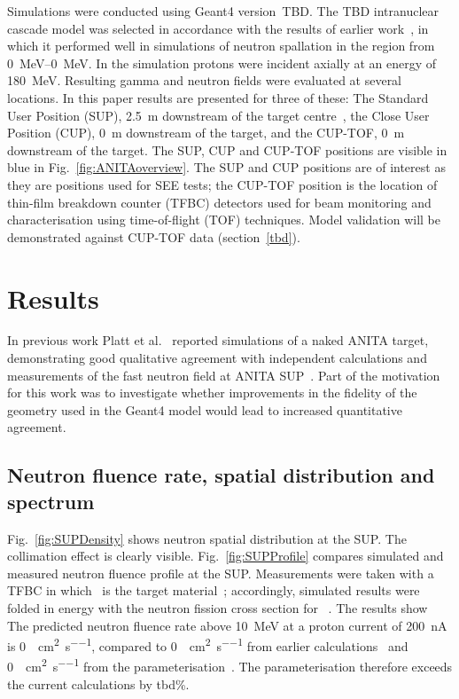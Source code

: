 \documentclass[12pt,journal]{IEEEtran}
\def\U238{\BPChem{\^{238}U}}
\begin{document}
Simulations were conducted using Geant4 version~TBD.
The TBD intranuclear cascade model was selected in accordance with the results of earlier work~\cite{Platt13}, in which it performed well in simulations of neutron spallation in the region from \SIrange{0}{0}{\MeV}.
In the simulation protons were incident axially at an energy of \SI{180}{\MeV}.
Resulting gamma and neutron fields were evaluated at several locations.
In this paper results are presented for three of these: The Standard User Position (SUP), \SI{2.5}{\m} downstream of the target centre~\cite{Prokofiev2009}, the Close User Position (CUP), \SI{0}{\m} downstream of the target, and the CUP-TOF, \SI{0}{m} downstream of the target.
The SUP, CUP and CUP-TOF positions are visible in blue in Fig.~\ref{fig:ANITAoverview}.
The SUP and CUP positions are of interest as they are positions used for SEE tests; the CUP-TOF position is the location of thin-film breakdown counter (TFBC) detectors used for beam monitoring and characterisation using time-of-flight (TOF) techniques.
Model validation will be demonstrated against CUP-TOF data (section~\ref{tbd}).

\section{Results}

In previous work Platt et al.~\cite{Platt13} reported simulations of a naked ANITA target, demonstrating good qualitative agreement with independent calculations and measurements of the fast neutron field at ANITA SUP~\cite{Prokofiev2009}.
Part of the motivation for this work was to investigate whether improvements in the fidelity of the geometry used in the Geant4 model would lead to increased quantitative agreement.

\subsection{Neutron fluence rate, spatial distribution and spectrum}

Fig.~\ref{fig:SUPDensity} shows neutron spatial distribution at the SUP.
The collimation effect is clearly visible.
Fig.~\ref{fig:SUPProfile} compares simulated and measured neutron fluence profile at the SUP.
Measurements were taken with a TFBC in which \U238\ is the target material~\cite{Prokofiev2009}; accordingly, simulated results were folded in energy with the neutron fission cross section for \U238~\cite{tbd}.
The results show~
The predicted neutron fluence rate above \SI{10}{\MeV} at a proton current of \SI{200}{\nA} is \SI{0}{\neutron\per\cm\squared\per\second}, compared to \SI{0}{\neutron\per\cm\squared\per\second} from earlier calculations~\cite{Platt13} and \SI{0}{\neutron\per\cm\squared\per\second} from the parameterisation~\cite{Prokofiev2009}.
The parameterisation therefore exceeds the current calculations by tbd\%.
\end{document}
